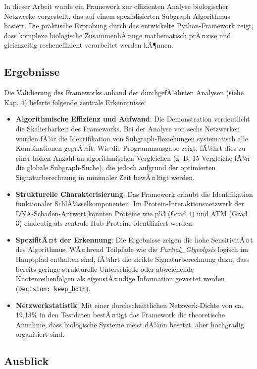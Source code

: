 ﻿\documentclass[a4paper,12pt]{article}
\theoremstyle{definition}
\begin{document}
In dieser Arbeit wurde ein Framework zur effizienten Analyse biologischer Netzwerke vorgestellt, das auf einem spezialisierten Subgraph Algorithmus basiert. Die praktische Erprobung durch das entwickelte Python-Framework zeigt, dass komplexe biologische ZusammenhÃ¤nge mathematisch prÃ¤zise und gleichzeitig recheneffizient verarbeitet werden kÃ¶nnen.

\subsection{Ergebnisse}

Die Validierung des Frameworks anhand der durchgefÃ¼hrten Analysen (siehe Kap. 4) lieferte folgende zentrale Erkenntnisse:

\begin{itemize}
	\item \textbf{Algorithmische Effizienz und Aufwand}: Die Demonstration verdeutlicht die Skalierbarkeit des Frameworks. Bei der Analyse von sechs Netzwerken wurden fÃ¼r die Identifikation von Subgraph-Beziehungen systematisch alle Kombinationen geprÃ¼ft. Wie die Programmausgabe zeigt, fÃ¼hrt dies zu einer hohen Anzahl an algorithmischen Vergleichen (z. B. 15 Vergleiche fÃ¼r die globale Subgraph-Suche), die jedoch aufgrund der optimierten Signaturberechnung in minimaler Zeit bewÃ¤ltigt werden.
	\item \textbf{Strukturelle Charakterisierung}: Das Framework erlaubt die Identifikation funktionaler SchlÃ¼sselkomponenten. Im Protein-Interaktionsnetzwerk der DNA-Schaden-Antwort konnten Proteine wie p53 (Grad 4) und ATM (Grad 3) eindeutig als zentrale Hub-Proteine identifiziert werden.
	\item \textbf{SpezifitÃ¤t der Erkennung}: Die Ergebnisse zeigen die hohe SensitivitÃ¤t des Algorithmus. WÃ¤hrend Teilpfade wie die \textit{Partial\_Glycolysis} logisch im Hauptpfad enthalten sind, fÃ¼hrt die strikte Signaturberechnung dazu, dass bereits geringe strukturelle Unterschiede oder abweichende Knotenreihenfolgen als eigenstÃ¤ndige Information gewertet werden (\texttt{Decision: keep\_both}).
	\item \textbf{Netzwerkstatistik}: Mit einer durchschnittlichen Netzwerk-Dichte von ca. 19,13\% in den Testdaten bestÃ¤tigt das Framework die theoretische Annahme, dass biologische Systeme meist dÃ¼nn besetzt, aber hochgradig organisiert sind.
\end{itemize}

\subsection{Ausblick}
\end{document}
